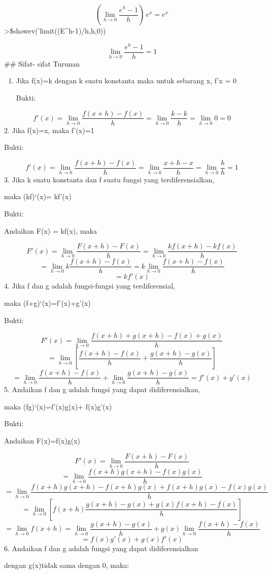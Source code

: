 \documentclass[
]{book}
\begin{document}
\[\left(\lim_{h\rightarrow 0}{\frac{e^{h}-1}{h}}\right)\,e^{x}=e^{x}\]\textgreater\$showev('limit((E\^{}h-1)/h,h,0))

\[\lim_{h\rightarrow 0}{\frac{e^{h}-1}{h}}=1\]\#\# Sifat- sifat Turunan

\begin{enumerate}
\def\labelenumi{\arabic{enumi}.}
\item
  Jika f(x)=k dengan k suatu konstanta maka untuk sebarang x, f'x = 0

  Bukti:
\end{enumerate}

\[f'(x)= \lim_{h\to 0}\frac{f(x+h)-f(x)}{h} = \lim_{h\to 0}\frac{k-k}{h} = \lim_{h\to 0}0=0\]2. Jika f(x)=x, maka f'(x)=1

Bukti:

\[f'(x)= \lim_{h\to 0}\frac{f(x+h)-f(x)}{h} = \lim_{h\to 0}\frac{x+h-x}{h}=\lim_{h\to 0}\frac {h}{h}=1\]3. Jika k suatu konstanta dan f suatu fungsi yang terdiferensialkan,

maka (kf)`(x)= kf'(x)

Bukti:

Andaikan F(x) = kf(x), maka

\[F'(x)=\lim_{h\to 0}\frac{F(x+h)-F(x)}{h}=\lim_{h\to 0}\frac{kf(x+h)-kf(x)}{h}\]\[    =\lim_{h\to 0}k \frac{f(x+h)-f(x)}{h}=k\lim_{h\to 0}\frac{f(x+h)-f(x)}{h}\]\[=kf'(x)\]4. Jika f dan g adalah fungsi-fungsi yang terdiferensial,

maka (f+g)`(x)=f'(x)+g'(x)

Bukti:

\[F'(x)=\lim_{h\to 0}\frac{f(x+h)+g(x+h)-f(x)+g(x)}{h}\]\[=\lim_{h\to 0}[\frac{f(x+h)-f(x)}{h}+\frac{g(x+h)-g(x)}{h}]\]\[=\lim_{h\to 0}\frac{f(x+h)-f(x)}{h}+\lim_{h\to 0}\frac{g(x+h)-g(x)}{h}=f'(x)+g'(x)\]5. Andaikan f dan g adalah fungsi yang dapat didiferensialkan,

maka (fg)`(x)=f'(x)g(x)+ f(x)g'(x)

Bukti:

Andaikan F(x)=f(x)g(x)

\[F'(x)= \lim_{h\to 0}\frac{F(x+h)-F(x)}{h}\]\[= \lim_{h\to 0}\frac{f(x+h)g(x+h)-f(x)g(x)}{h}\]\[= \lim_{h\to 0}\frac{f(x+h)g(x+h)-f(x+h)g(x)+f(x+h)g(x)-f(x)g(x)}{h}\]\[=\lim_{h\to 0}[f(x+h)\frac{g(x+h)-g(x)+g(x)f(x+h)-f(x)}{h}]\]\[=\lim_{h\to 0} f(x+h)=\lim_{h \to 0}\frac{g(x+h)-g(x)}{h}+g(x)\lim_{h\to 0}\frac{f(x+h)-f(x)}{h}\]\[=f(x)g'(x)+g(x)f'(x)\]6. Andaikan f dan g adalah fungsi yang dapat didiferensialkan

dengan g(x)tidak sama dengan 0, maka:
\end{document}
